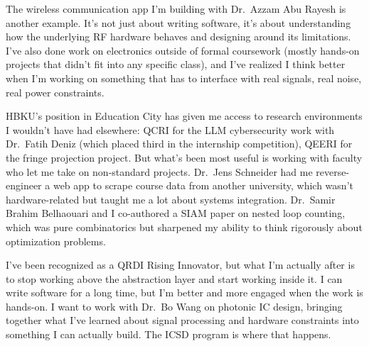\documentclass[11pt,a4paper]{article}
\begin{document}
The wireless communication app I'm building with Dr.\ Azzam Abu Rayesh is another example. It's not just about writing software, it's about understanding how the underlying RF hardware behaves and designing around its limitations. I've also done work on electronics outside of formal coursework (mostly hands-on projects that didn't fit into any specific class), and I've realized I think better when I'm working on something that has to interface with real signals, real noise, real power constraints.

HBKU's position in Education City has given me access to research environments I wouldn't have had elsewhere: QCRI for the LLM cybersecurity work with Dr.\ Fatih Deniz (which placed third in the internship competition), QEERI for the fringe projection project. But what's been most useful is working with faculty who let me take on non-standard projects. Dr.\ Jens Schneider had me reverse-engineer a web app to scrape course data from another university, which wasn't hardware-related but taught me a lot about systems integration. Dr.\ Samir Brahim Belhaouari and I co-authored a SIAM paper on nested loop counting, which was pure combinatorics but sharpened my ability to think rigorously about optimization problems.

I've been recognized as a QRDI Rising Innovator, but what I'm actually after is to stop working above the abstraction layer and start working inside it. I can write software for a long time, but I'm better and more engaged when the work is hands-on. I want to work with Dr.\ Bo Wang on photonic IC design, bringing together what I've learned about signal processing and hardware constraints into something I can actually build. The ICSD program is where that happens.
\end{document}
